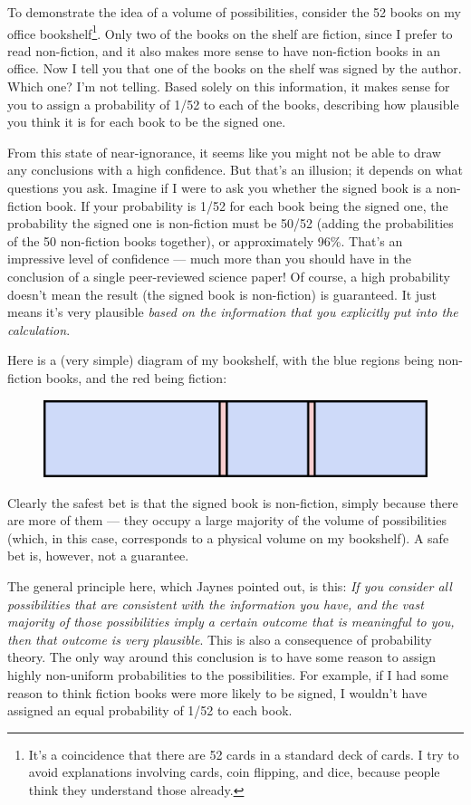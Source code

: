 \documentclass[a4paper, 12pt]{article}
\begin{document}
To demonstrate the idea of a volume of possibilities,
consider the 52 books on my office bookshelf\footnote{It's
a coincidence that there are 52 cards in a standard
deck of cards. I try to avoid explanations involving cards, coin flipping, and
dice, because people think they understand those already.}.
Only two of the books on the shelf are fiction, since I prefer to read
non-fiction, and it also makes more sense to have non-fiction books in an
office. Now I tell you that one of the books on the shelf was
signed by the author. Which one? I'm not telling. Based solely on this
information, it makes sense for you to assign a probability of 1/52 to each of the
books, describing how plausible you think it is for each book to be the signed
one.

From this state of near-ignorance, it seems like you might not be able to draw
any conclusions with a high confidence. But that's an illusion; it depends on
what questions you ask. Imagine if I were to ask you whether the signed book
is a non-fiction book. If your probability is 1/52 for each book being the
signed one, the probability the signed one is non-fiction must be
50/52 (adding the probabilities of the 50 non-fiction books together), 
or approximately 96\%. That's an impressive level of confidence --- much more than you should have in the conclusion of a single peer-reviewed science paper!
Of course, a high probability doesn't mean the result (the signed book is
non-fiction) is guaranteed. It just means it's very plausible {\em based on the
information that you explicitly put into the calculation}.

Here is a (very simple) diagram of my bookshelf, with the blue regions
being non-fiction books, and the red being fiction:
\begin{figure}[ht!]
\centering
\includegraphics{bookshelf.png}
\end{figure}
Clearly the safest bet is that the signed book is non-fiction, simply because
there are more of them --- they occupy a large majority of the volume of
possibilities (which, in this case, corresponds to a physical volume on my
bookshelf). A safe bet is, however, not a guarantee.

The general principle here, which Jaynes pointed out, is this:
{\em If you consider all possibilities that are consistent with
the information you have, and the vast majority of those possibilities
imply a certain outcome that is meaningful to you, then that outcome is very
plausible}. This is also a consequence of probability theory. The only
way around this conclusion is to have some reason to assign highly
non-uniform probabilities to the possibilities. For example, if I had
some reason to think fiction books were more likely to be signed, I wouldn't
have assigned an equal probability of 1/52 to each book.
\end{document}
